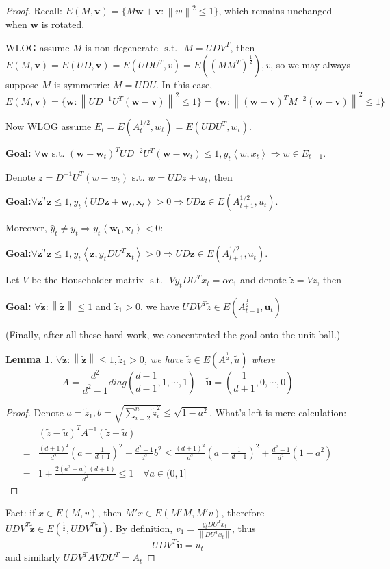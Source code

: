 \documentclass{book}
\newcommand{\st}{\text{ s.t. }}
\newcommand{\nm}[1]{\left\|#1\right\|}
\newcommand{\dual}[1]{\left<#1\right>}
\newtheorem{Lemma}[Thm]{Lemma}
\begin{document}
\begin{proof}
  Recall: $E(M,\bm v)=\{M\bm w+\bm v:\nm{w}^{2}\leq 1\}$, which remains unchanged when $\bm w$ is rotated.
  
  WLOG assume $M$ is non-degenerate $\st$ $M=UDV^{T}$, then $E(M,\bm v)=E(UD,\bm v)=E(UDU^{T}, v)=E((MM^{T})^{\frac 1 2}),v$, so we may always suppose $M$ is symmetric: $M=UDU$. In this case,
  \[E(M,\bm v)=\{\bm w:\nm{UD^{-1}U^{T}(\bm w-\bm v)}^{2}\leq 1\}=\{\bm w:\nm{(\bm w-\bm v)^{T}M^{-2}(\bm w-\bm v)}^{2}\leq 1\}\]

  Now WLOG  assume $E_{t}=E(A^{1/2}_{t},w_{t})=E(UDU^{T},w_{t})$.
  
  \textbf{Goal:} $\forall \bm w\st (\bm w-\bm w_{t})^{T}UD^{-2}U^{T}(\bm w-\bm w_{t})\leq 1, y_{t}\dual{w,x_{t}}\Rightarrow w\in E_{t+1}$.

  Denote $z=D^{-1}U^{T}(w-w_{t})\st w=UDz+w_{t} $, then

  \textbf{Goal:}$\forall \bm z^{T}\bm z\leq 1, y_{t}\dual{UD\bm z+\bm w_{t},\bm x_{t}}>0\Rightarrow UD\bm z\in E(A^{1/2}_{t+1},u_{t})$.

  Moreover, $\hat y_{t}\neq y_{t}\Rightarrow y_{t}\dual{\bm{w_{t}},\bm x_{t}}<0$:

  \textbf{Goal:}$\forall \bm z^{T}\bm z\leq 1, y_{t}\dual{\bm z,y_{t}DU^{T}\bm x_{t}}>0\Rightarrow UD\bm z\in E(A^{1/2}_{t+1},u_{t})$.

  
  Let $V$ be the Householder matrix $\st$ $Vy_{t}DU^{T}x_{t}=\alpha e_{1}$ and denote $\tilde z=Vz$, then

  \textbf{Goal:} $\forall \tilde {\bm z}: \nm{\tilde{\bm{z}}}\leq 1$ and $\tilde z_{1}>0$, we have $UDV^{T}\tilde z\in E(A^{\frac 1 2}_{t+1},\bm u_{t})$

  (Finally, after all these hard work, we concentrated the goal onto the unit ball.)
  \begin{Lemma}
    $\forall \tilde{\bm{z}}:\nm{\tilde{\bm z}}\leq 1, \tilde z_{1}>0$, we have $\tilde z\in E(A^{\frac{1}{2}},\tilde u)$ where
    \[A=\frac{d^{2}}{d^{2}-1}diag(\frac{d-1}{d-1},1,\cdots,1)\quad\tilde{\bm u}=(\frac{1}{d+1},0,\cdots,0)\]
  \end{Lemma}
  \begin{proof}
    Denote $a=\tilde z_{1},b=\sqrt{\sum_{i=2}^{n}\tilde z_{i}^{2}}\leq \sqrt{1-a^{2}}$. What's left is mere calculation:
    \begin{align*}
      &(\tilde z-\tilde u)^{T}A^{-1}(\tilde z-\tilde u)\\
      =&\frac{(d+1)^{2}}{d^{2}}(a-\frac{1}{d+1})^{2}+\frac{d^{2}-1}{d^{2}}b^{2}\leq \frac{(d+1)^{2}}{d^{2}}(a-\frac{1}{d+1})^{2}+\frac{d^{2}-1}{d^{2}}(1-a^{2})\\
      =&1+\frac{2(a^{2}-a)(d+1)}{d^{2}}\leq 1\quad \forall a\in (0,1]
    \end{align*}
  \end{proof}
  Fact: if $x\in E(M,v)$, then $M'x\in E(M'M,M'v)$, therefore $UDV^{T}\tilde{\bm z}\in E(^{\frac 1 2},UDV^{T}\tilde{\bm u})$. By definition, $v_{1}=\frac{y_{t}DU^{T}x_{t}}{\nm{DU^{T}x_{t}}}$, thus
  \[UDV^{T}\tilde{\bm{u}}=u_{t}\]
  and similarly $UDV^{T}AVDU^{T}=A_{t}$%
\end{proof}
\end{document}
